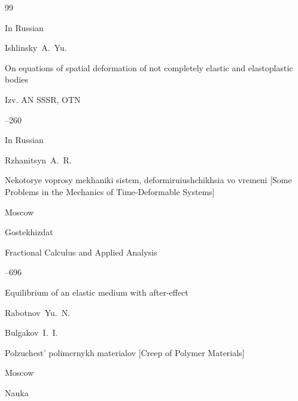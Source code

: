 \begin{thebibliography}{99}

\lang In Russian

\by	Ishlinsky~A.~Yu.

\paper  On equations of spatial deformation of not completely elastic and elastoplastic bodies

\jour  Izv. AN SSSR, OTN



–260








\lang In Russian

\by Rzhanitsyn~A.~R.

\book Nekotorye voprosy mekhaniki sistem, deformiruiushchikhsia vo vremeni \rm [Some Problems in the Mechanics of Time-Deformable Systems]

\publaddr Moscow

\publ Gostekhizdat








\jour Fractional Calculus and Applied Analysis




--696

\paper  Equilibrium of an elastic medium with after-effect

\by Rabotnov~Yu.~N.








\by Bulgakov~I.~I.

\book Polzuchest' polimernykh materialov \rm [Creep of Polymer Materials]

\publaddr Moscow

\publ Nauka






\end{thebibliography}
